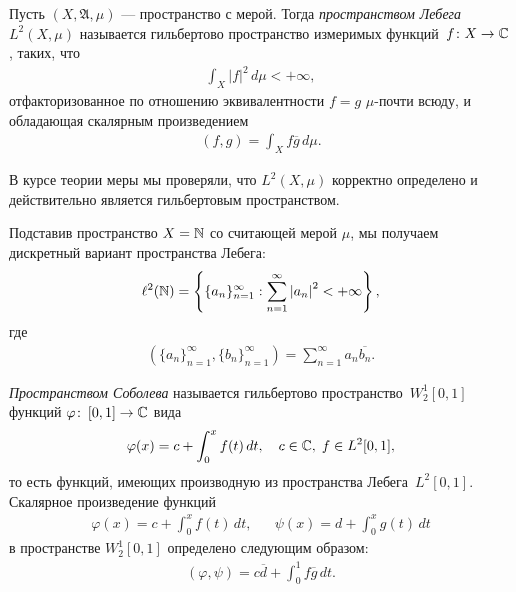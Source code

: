 \documentclass[../complex-analysis.tex]{subfiles}
\begin{document}
\begin{exmpl}
 Пусть $ (X,\mathfrak A,\mu) $ --- пространство с мерой. Тогда \emph{пространством Лебега~$ L^{2}(X,\mu) $} называется гильбертово пространство измеримых функций~$ f \colon X \to \mathbb{C} $, таких, что
 \begin{align*}
  \int_{X} \left| f \right|^{2} \,d\mu < +\infty,
 \end{align*} отфакторизованное по отношению эквивалентности $ f = g $ $ \mu $-почти всюду, и обладающая скалярным произведением
 \begin{align*}
  (f,g) = \int_{X} f\overline g\,d\mu. 
 \end{align*}

 В курсе теории меры мы проверяли, что $ L^{2}(X,\mu) $  корректно определено и действительно является гильбертовым пространством.

 Подставив пространство $ X = \mathbb{N} $ со считающей мерой  $ \mu $, мы получаем дискретный вариант пространства Лебега:
 \begin{align*}
  \ell^{2}(\mathbb{N}) = \left\{ \{a_{n}\}_{n=1}^{\infty} : \sum_{n=1}^{\infty} \left| a_n \right|^{2} < +\infty  \right\},
 \end{align*} где
 \begin{align*}
  \left( \{a_{n}\}_{n=1}^{\infty}, \{b_{n}\}_{n=1}^{\infty} \right) = \sum_{n=1}^{\infty} a_n \overline{b_n}.
 \end{align*}
\end{exmpl}

\begin{exmpl}
 \emph{Пространством Соболева} называется гильбертово пространство~$ W_2^{1}[0,1] $  функций $ \varphi \colon\, [0,1] \to \mathbb{C} $ вида
 \begin{align*}
  \varphi(x) = c + \int_{0}^{x} f(t)\,dt, \quad c \in \mathbb{C},\; f \in L^{2}[0,1],
 \end{align*} то есть функций, имеющих производную из пространства Лебега~$ L^{2}[0,1] $. Скалярное произведение функций
 \begin{align*}
  \varphi(x) = c + \int_{0}^{x} f(t)\,dt, && \psi(x) = d + \int_{0}^{x} g(t)\,dt
 \end{align*} в пространстве $ W_2^{1}[0,1] $ определено следующим образом:
 \begin{align*}
  (\varphi,\psi) = c\overline d + \int_{0}^{1} f \overline g\,dt.
 \end{align*}
\end{exmpl}
\end{document}
